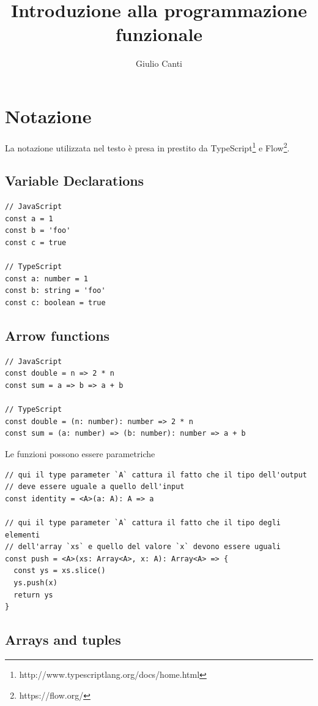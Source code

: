 \documentclass[12pt]{article}
\title{
  Introduzione alla programmazione funzionale
}
\author{Giulio Canti}
\date{}
\begin{document}
\maketitle

\tableofcontents

\newpage

\section{Notazione}

La notazione utilizzata nel testo è presa in prestito da TypeScript\footnote{http://www.typescriptlang.org/docs/home.html} e Flow\footnote{https://flow.org/}.

\subsection{Variable Declarations}

\begin{verbatim}
// JavaScript
const a = 1
const b = 'foo'
const c = true

// TypeScript
const a: number = 1
const b: string = 'foo'
const c: boolean = true
\end{verbatim}

\subsection{Arrow functions}

\begin{verbatim}
// JavaScript
const double = n => 2 * n
const sum = a => b => a + b

// TypeScript
const double = (n: number): number => 2 * n
const sum = (a: number) => (b: number): number => a + b
\end{verbatim}

Le funzioni possono essere parametriche

\begin{verbatim}
// qui il type parameter `A` cattura il fatto che il tipo dell'output
// deve essere uguale a quello dell'input
const identity = <A>(a: A): A => a

// qui il type parameter `A` cattura il fatto che il tipo degli elementi
// dell'array `xs` e quello del valore `x` devono essere uguali
const push = <A>(xs: Array<A>, x: A): Array<A> => {
  const ys = xs.slice()
  ys.push(x)
  return ys
}
\end{verbatim}

\subsection{Arrays and tuples}
\end{document}
